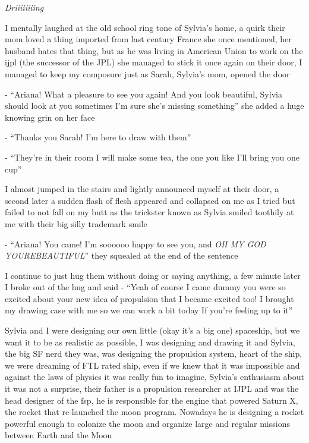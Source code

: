 \documentclass[hidelinks,12pt,a4paper]{book}
\begin{document}
\textit{Driiiiiiiing}\par
I mentally laughed at the old school ring tone of Sylvia's home, 
a quirk their mom loved a thing imported from last century France she once mentioned, 
her husband hates that thing, but as he was living in American Union to work on the 
\gls{ijpl} (the successor of the JPL) she managed to stick it once again on their door, 
I managed to keep my composure just as Sarah, Sylvia's mom, opened the door\par
\bigskip

- “Ariana! What a pleasure to see you again! And you look beautiful, 
Sylvia should look at you sometimes I'm sure she's missing something” she added a huge knowing grin on her face\par
- “Thanks you Sarah! I'm here to draw with them”\par 
- “They're in their room I will make some tea, the one you like I'll bring you one cup”\par
\bigskip

I almost jumped in the stairs and lightly announced myself at their door, 
a second later a sudden flash of flesh appeared and collapsed on me as 
I tried but failed to not fall on my butt as the trickster known as Sylvia smiled 
toothily at me with their big silly trademark smile\newline

- “Ariana! You came! I'm soooooo happy to see you, and \textit{OH MY GOD YOUREBEAUTIFUL}” they squealed at the end of the sentence\par
\bigskip

I continue to just hug them without doing or saying anything, a few minute later I broke out of the hug and said\newline
- “Yeah of course I came dummy you were so excited about your new idea of propulsion that 
I became excited too! I brought my drawing case with me so we can work a bit today If you're feeling up to it”\par
\bigskip

Sylvia and I were designing our own little (okay it's a big one) spaceship,
 but we want it to be as realistic as possible, I was designing and drawing it and Sylvia, 
 the big SF nerd they was, was designing the propulsion system, heart of the ship, 
 we were dreaming of FTL rated ship, even if we knew that it was impossible and against the laws of physics 
 it was really fun to imagine, Sylvia's enthusiasm about it was not a surprise, their father is a propulsion 
 researcher at IJPL and was the head designer of the \gls{fsp}, he is responsible for the engine 
 that powered Saturn X, the rocket that re-launched the moon program. Nowadays he is designing a rocket powerful 
 enough to colonize the moon and organize large and regular missions between Earth and the Moon\par
 \bigskip
\end{document}
